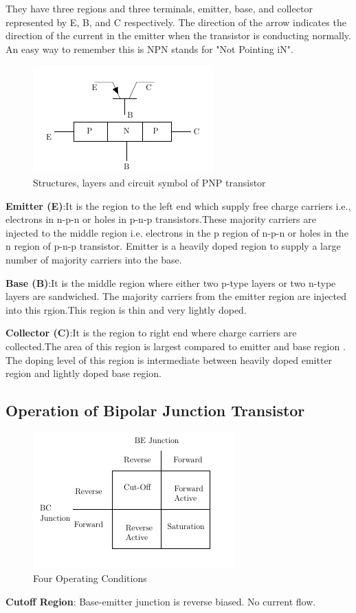 			They have three regions and three terminals, emitter, base, and collector represented by E, B, and C respectively. The direction of the arrow indicates the direction of the current in the emitter when the transistor is conducting normally. An easy way to remember this is NPN stands for "Not Pointing iN".
			\begin{figure}[h]
				\centering
				\includegraphics[width=0.5\linewidth]{img/exp9/2}
				\caption{Structures, layers and circuit symbol of PNP transistor}
				\label{fig:bjt_pnp}
			\end{figure}
		
			\textbf{Emitter (E)}:It is the region to the left end which supply free charge carriers i.e., electrons in n-p-n or holes in p-n-p transistors.These majority carriers are injected to the middle region i.e. electrons in the p region of n-p-n or holes in the n region of p-n-p transistor. Emitter is a heavily doped region to supply a large number of majority carriers into the base.
			
			\textbf{Base (B)}:It is the middle region where either two p-type layers or two n-type layers are sandwiched. The majority carriers from the emitter region are injected into this rgion.This region is thin and very lightly doped.
			
			\textbf{Collector (C)}:It is the region to right end where charge carriers are collected.The area of this region is largest compared to emitter and base region . The doping level of this region is intermediate between heavily doped emitter region and lightly doped base region.
			
		\subsection{Operation of Bipolar Junction Transistor}
			\begin{figure}[h]
				\centering
				\includegraphics[width=0.7\linewidth]{img/exp9/3}
				\caption{Four Operating Conditions}
				\label{fig:bjt_op_conditions}
			\end{figure}
			\textbf{Cutoff Region}: Base-emitter junction is reverse biased. No current flow.
			
